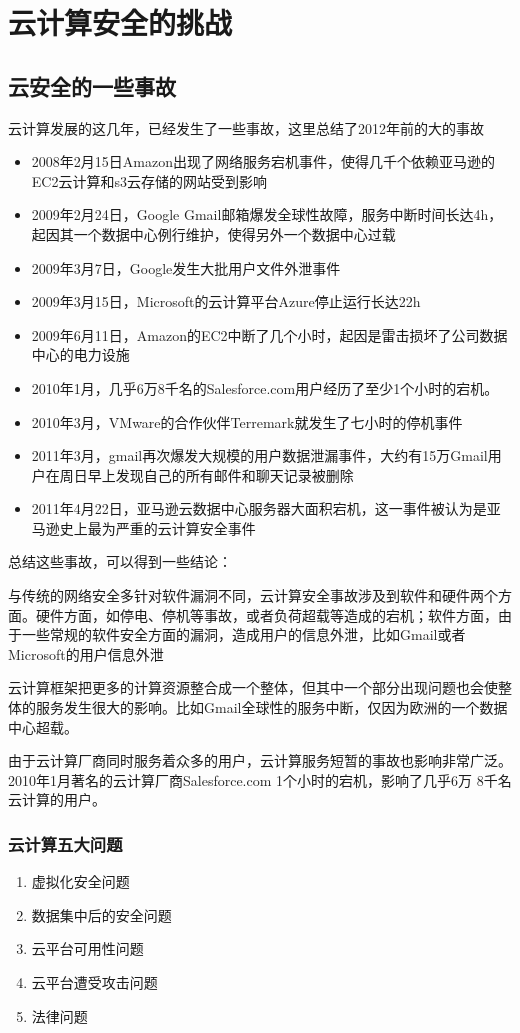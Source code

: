 \documentclass[a4paper]{ctexart}
\begin{document}
    \section{云计算安全的挑战}
    \subsection{云安全的一些事故}
    云计算发展的这几年，已经发生了一些事故，这里总结了2012年前的大的事故
    \begin{itemize}
        \item 2008年2月15日Amazon出现了网络服务宕机事件，使得几千个依赖亚马逊的EC2云计算和s3云存储的网站受到影响
        \item 2009年2月24日，Google Gmail邮箱爆发全球性故障，服务中断时间长达4h，起因其一个数据中心例行维护，使得另外一个数据中心过载
        \item 2009年3月7日，Google发生大批用户文件外泄事件
        \item 2009年3月15日，Microsoft的云计算平台Azure停止运行长达22h
        \item 2009年6月11日，Amazon的EC2中断了几个小时，起因是雷击损坏了公司数据中心的电力设施
        \item 2010年1月，几乎6万8千名的Salesforce.com用户经历了至少1个小时的宕机。
        \item 2010年3月，VMware的合作伙伴Terremark就发生了七小时的停机事件
        \item 2011年3月，gmail再次爆发大规模的用户数据泄漏事件，大约有15万Gmail用户在周日早上发现自己的所有邮件和聊天记录被删除
        \item 2011年4月22日，亚马逊云数据中心服务器大面积宕机，这一事件被认为是亚马逊史上最为严重的云计算安全事件
    \end{itemize}
    {\color{red}
    总结这些事故，可以得到一些结论：
    \par 与传统的网络安全多针对软件漏洞不同，云计算安全事故涉及到软件和硬件两个方面。硬件方面，如停电、停机等事故，或者负荷超载等造成的宕机；软件方面，由于一些常规的软件安全方面的漏洞，造成用户的信息外泄，比如Gmail或者Microsoft的用户信息外泄
    \par 云计算框架把更多的计算资源整合成一个整体，但其中一个部分出现问题也会使整体的服务发生很大的影响。比如Gmail全球性的服务中断，仅因为欧洲的一个数据中心超载。
\par 由于云计算厂商同时服务着众多的用户，云计算服务短暂的事故也影响非常广泛。2010年1月著名的云计算厂商Salesforce.com 1个小时的宕机，影响了几乎6万 8千名云计算的用户。}

    \subsubsection{云计算五大问题}
    \begin{enumerate}
        \item 虚拟化安全问题
        \item 数据集中后的安全问题
        \item 云平台可用性问题
        \item 云平台遭受攻击问题
        \item 法律问题
    \end{enumerate}
\end{document}
